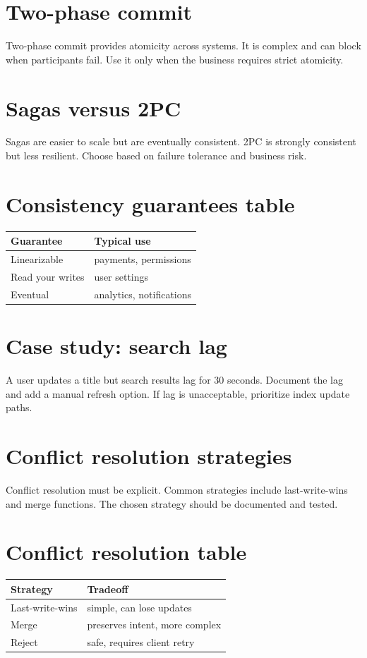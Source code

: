 \section{Two-phase commit}
Two-phase commit provides atomicity across systems.
It is complex and can block when participants fail.
Use it only when the business requires strict atomicity.

\section{Sagas versus 2PC}
Sagas are easier to scale but are eventually consistent.
2PC is strongly consistent but less resilient.
Choose based on failure tolerance and business risk.

\section{Consistency guarantees table}
\begin{tabularx}{\textwidth}{@{}lX@{}}
\toprule
Guarantee & Typical use \\
\midrule
Linearizable & payments, permissions \\
Read your writes & user settings \\
Eventual & analytics, notifications \\
\bottomrule
\end{tabularx}

\section{Case study: search lag}
A user updates a title but search results lag for 30 seconds.
Document the lag and add a manual refresh option.
If lag is unacceptable, prioritize index update paths.

\section{Conflict resolution strategies}
Conflict resolution must be explicit.
Common strategies include last-write-wins and merge functions.
The chosen strategy should be documented and tested.

\section{Conflict resolution table}
\begin{tabularx}{\textwidth}{@{}lX@{}}
\toprule
Strategy & Tradeoff \\
\midrule
Last-write-wins & simple, can lose updates \\
Merge & preserves intent, more complex \\
Reject & safe, requires client retry \\
\bottomrule
\end{tabularx}


